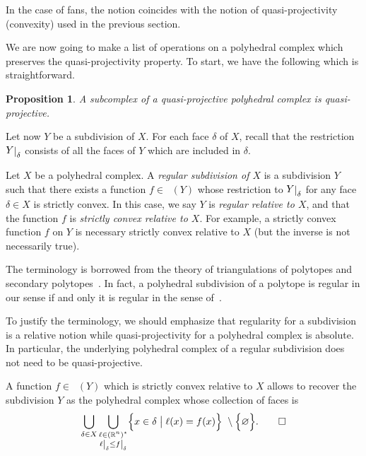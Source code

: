 \documentclass[11pt]{amsart}
\newtheorem{prop}[thm]{Proposition}
\theoremstyle{definition}
\newenvironment{remark}
  {\pushQED{\qed}\renewcommand{\qedsymbol}{$\diamond$}\remm}
  {\popQED\endremm}
\numberwithin{equation}{section}
\renewcommand{\~}{\widetilde}
\newcommand{\R}{\mathbb{R}}
\renewcommand{\emptyset}{\varnothing}
\newcommand{\rest}[1]{\raisebox{-1pt}{$\vert$}_{#1}}
\newcommand{\dual}{\star} %
\newcommand{\st}{\bigm|} %
\DeclareMathOperator{\lpm}{\mathcal L^{pm}} %
\begin{document}
\begin{remark}
In the case of fans, the notion coincides with the notion of quasi-projectivity (convexity) used in the previous section.
\end{remark}

We are now going to make a list of operations on a polyhedral complex which preserves the quasi-projectivity property.
To start, we have the following which is straightforward.

\begin{prop} \label{prop:sous-complexe_projectif}
A subcomplex of a quasi-projective polyhedral complex is quasi-projective.
\end{prop}

Let now $Y$ be a subdivision of $X$. For each face $\delta$ of $X$, recall that the restriction $Y\rest \delta$ consists of all the faces of $Y$ which are included in $\delta$.

\medskip

Let $X$ be a polyhedral complex. A \emph{regular subdivision of $X$} is a subdivision $Y$ such that there exists a function $f\in\lpm(Y)$ whose restriction to $Y\rest\delta$ for any face $\delta\in X$ is strictly convex. In this case, we say $Y$ is \emph{regular relative to $X$}, and that the function $f$ is \emph{strictly convex relative to $X$}. For example, a strictly convex function $f$ on $Y$ is necessary strictly convex relative to $X$ (but the inverse is not necessarily true).

\begin{remark} The terminology is borrowed from the theory of triangulations of polytopes and secondary polytopes~\cites{GKZ, DRS}. In fact, a polyhedral subdivision of a polytope is regular in our sense if and only it is regular in the sense of~\cite{GKZ}.
\end{remark}

\begin{remark} To justify the terminology, we should emphasize that regularity for a subdivision is a relative notion while quasi-projectivity for a polyhedral complex is absolute. In particular, the underlying polyhedral complex of a regular subdivision does not need to be quasi-projective.
\end{remark}

\begin{remark}
A function $f \in \lpm(Y)$ which is strictly convex relative to $X$ allows to recover the subdivision $Y$ as the polyhedral complex whose collection of faces is
\[ \bigcup_{\delta\in X}\bigcup_{\substack{\ell\in(\R^n)^\dual \\ \ell\rest\delta\leq f\rest\delta}}\Bigl\{x\in\delta\st\ell(x)=f(x)\Bigr\}\ \setminus\Bigl\{\emptyset\Bigr\}. \qedhere \]
\end{remark}
\end{document}
